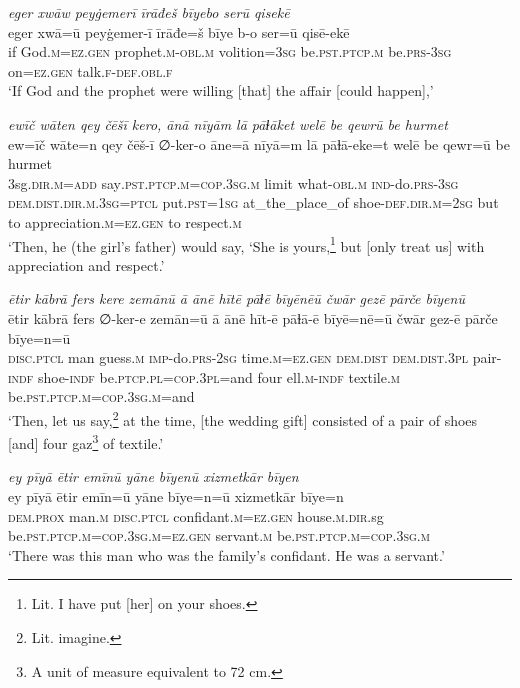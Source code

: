 \ea \label{RE.9}
\textit{eger xwāw peyġemerī īrāđeš bīyebo serū qisekē} \\ 
\gll eger xwā=ū peyġemer-ī īrāđe=š bīye b-o ser=ū qisē-ekē \\ 
 if God\textsc{.m}\textsc{\textsc{=ez.gen}} prophet\textsc{.m}\textsc{-obl}\textsc{.m} volition\textsc{=3sg} be\textsc{.pst}\textsc{.ptcp}\textsc{.m} be\textsc{.prs}\textsc{-3sg} on\textsc{\textsc{=ez.gen}} talk\textsc{.f}\textsc{-def}\textsc{.obl}\textsc{.f} \\ 
\glt `If God and the prophet were willing [that] the affair [could happen],'
\z 
 
\ea \label{RE.10}
\textit{ewīč wāten qey čēšī kero, ānā nīyām lā pāɫāket welē be qewrū be hurmet} \\ 
\gll ew=īč wāte=n qey čēš-ī ∅-ker-o āne=ā nīyā=m lā pāɫā-eke=t welē be qewr=ū be hurmet \\ 
 3sg\textsc{.dir}\textsc{.m}\textsc{=add} say\textsc{.pst}\textsc{.ptcp}\textsc{.m}\textsc{=cop}\textsc{.3sg}\textsc{.m} limit what\textsc{-obl}\textsc{.m} \textsc{ind-}do\textsc{.prs}\textsc{-3sg} \textsc{dem.dist}\textsc{.dir}\textsc{.m}\textsc{.3sg}=\textsc{ptcl} put\textsc{.pst}\textsc{=\textsc{1sg}} at\_the\_place\_of shoe\textsc{-def}\textsc{.dir}\textsc{.m}\textsc{=\textsc{2sg}} but to appreciation\textsc{.m}\textsc{\textsc{=ez.gen}} to respect\textsc{.m} \\ 
\glt `Then, he (the girl’s father) would say, ‘She is yours,\footnote{Lit. I have put [her] on your shoes.} but [only treat us] with appreciation and respect.'
\z 
 
\ea \label{RE.11}
\textit{ētir kābrā fers kere zemānū ā ānē hītē pāɫē bīyēnēū čwār gezē pārče bīyenū} \\ 
\gll ētir kābrā fers ∅-ker-e zemān=ū ā ānē hīt-ē pāɫā-ē bīyē=nē=ū čwār gez-ē pārče bīye=n=ū \\ 
 \textsc{disc.ptcl} man guess\textsc{.m} \textsc{imp-}do\textsc{.prs}-\textsc{2sg} time\textsc{.m}\textsc{=ez.gen} \textsc{dem.dist} \textsc{dem.dist}\textsc{.3pl} pair\textsc{-indf} shoe\textsc{-indf} be\textsc{.ptcp}\textsc{.pl}\textsc{=cop}\textsc{.3pl}=and four ell\textsc{.m}\textsc{-indf} textile\textsc{.m} be\textsc{.pst}\textsc{.ptcp}\textsc{.m}\textsc{=cop}\textsc{.3sg}\textsc{.m}=and \\ 
\glt `Then, let us say,\footnote{Lit. imagine.} at the time, [the wedding gift] consisted of a pair of shoes [and] four gaz\footnote{A unit of measure equivalent to 72 cm.} of textile.'
\z 
 
\ea \label{RE.16}
\textit{ey pīyā ētir emīnū yāne bīyenū xizmetkār bīyen} \\ 
\gll ey pīyā ētir emīn=ū yāne bīye=n=ū xizmetkār bīye=n \\ 
 \textsc{dem.prox} man\textsc{.m} \textsc{disc.ptcl} confidant\textsc{.m}\textsc{=ez.gen} house\textsc{.m}\textsc{.dir}.sg be\textsc{.pst}\textsc{.ptcp}\textsc{.m}\textsc{=cop}\textsc{.3sg}\textsc{.m}\textsc{=ez.gen} servant\textsc{.m} be\textsc{.pst}\textsc{.ptcp}\textsc{.m}\textsc{=cop}\textsc{.3sg}\textsc{.m} \\ 
\glt `There was this man who was the family’s confidant. He was a servant.'
\z 
 
